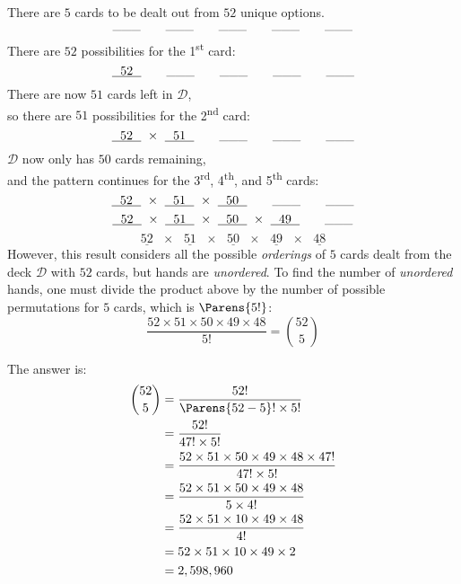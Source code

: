 \documentclass{ProblemSetCUNY}
\newcommand{\Deck}{\ensuremath{\bm{\mathcal{D}}}\xspace}
\begin{document}
\begin{minipage}[t]{.49\textwidth}
There are $5$ cards to be dealt out from $52$ unique options.
\[
\_\_\_\qquad\_\_\_\qquad\_\_\_\qquad\_\_\_\qquad\_\_\_
\]
There are $52$ possibilities for the 1\textsuperscript{st} card:
\[
\underline{~~52~~}\qquad\_\_\_\qquad\_\_\_\qquad\_\_\_\qquad\_\_\_
\]
There are now $51$ cards left in \Deck,\\so there are $51$ possibilities for the 2\textsuperscript{nd} card:
\[
\underline{~~52~~}~\times~\underline{~~51~~}\qquad\_\_\_\qquad\_\_\_\qquad\_\_\_
\]
\Deck now only has $50$ cards remaining,\\and the pattern continues for the 3\textsuperscript{rd}, 4\textsuperscript{th}, and 5\textsuperscript{th} cards:
\[
\underline{~~52~~}~\times~\underline{~~51~~}~\times~\underline{~~50~~}\qquad\_\_\_\qquad\_\_\_
\]
\[
\underline{~~52~~}~\times~\underline{~~51~~}~\times~\underline{~~50~~}~\times~\underline{~~49~~}\qquad\_\_\_
\]
\[
\underline{~~52~~}~\times~\underline{~~51~~}~\times~\underline{~~50~~}~\times~\underline{~~49~~}~\times~\underline{~~48~~}
\]
However, this result considers all the possible \emph{orderings} of $5$ cards dealt from the deck \Deck with $52$ cards, but hands are \emph{unordered}.
To find the number of \emph{unordered} hands, one must divide the product above by the number of possible permutations for $5$ cards, which is $\Parens{5!}$:
\[
\frac{52\times51\times50\times49\times48}{5!} = \binom{52}{5}
\]
\end{minipage}
\begin{minipage}[t]{.49\textwidth}
\hspace*{5mm}The answer is:
\begin{align*}
\binom{52}{5} &= \frac{52!}{\Parens{52 - 5}! \times 5!}\\
&= \frac{52!}{47! \times 5!}\\
&= \frac{52\times51\times50\times49\times48\times47!}{47! \times 5!}\\
&= \frac{52\times51\times50\times49\times48}{5\times4!}\\
&= \frac{52\times51\times10\times49\times48}{4!}\\
&= 52\times51\times10\times49\times2\\
&= 2,598,960
\end{align*}
\end{minipage}
\end{document}
